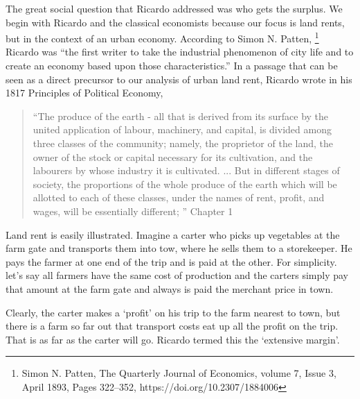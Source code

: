 The great social question that Ricardo addressed  was who gets the surplus. %
We begin with Ricardo and the classical economists because our focus is land rents, but in the context of an urban economy. According to Simon N. Patten, \footnote{Simon N. Patten,  The Quarterly Journal of Economics, volume 7, Issue 3, April 1893, Pages 322–352, https://doi.org/10.2307/1884006 }  Ricardo was ``the first writer to take the industrial phenomenon of city life and to create an economy based upon those characteristics.'' %
In a passage that can be seen as a direct precursor to our analysis of urban land rent, Ricardo  wrote in his 1817 Principles of Political Economy, %

\begin{quotation}   
 “The produce of the earth - all that is derived from its surface by the united application of labour, machinery, and capital, is divided among three classes of the community; namely, the proprietor of the land, the owner of the stock or capital necessary for its cultivation, and the labourers by whose industry it is cultivated. ...  But in different stages of society, the proportions of the whole produce of the earth which will be allotted to each of these classes, under the names of rent, profit, and wages, will be essentially different; ”  Chapter 1
\end{quotation}

Land rent is easily illustrated. Imagine a carter who picks up vegetables at the farm gate and transports them into tow, where he sells them to a  storekeeper. He pays  the farmer at one end of the trip and is paid at the other. For simplicity. let's say all farmers have the same cost of production and the carters simply pay that amount at the farm gate and always is paid the merchant price in town. 

Clearly, the carter makes a `profit'  on his trip to the  farm nearest to town, but there is a farm so far out  that transport costs   eat up all the profit on the trip. That is as far as the carter will go. Ricardo termed this the `extensive margin'. 

